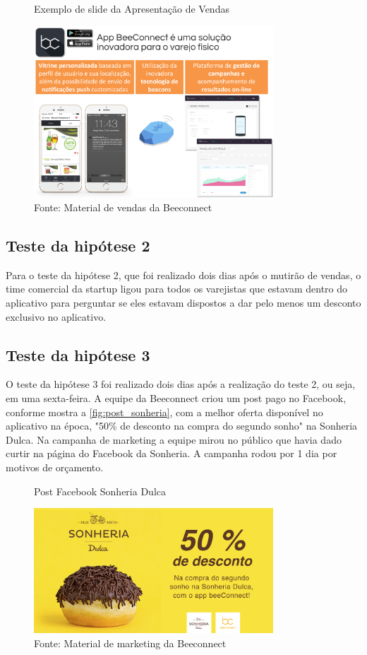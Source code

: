 \begin{figure}[H]
\caption{Exemplo de slide da Apresentação de Vendas}
\centerline{\includegraphics[width=0.8\textwidth]{img/apresentacao_vendas_bc}}
\label{fig:apresentacao_vendas_bc}
\caption* {Fonte: Material de vendas da Beeconnect}
\end{figure}

\subsection{Teste da hipótese 2}
\label{cha:teste_2}
Para o teste da hipótese 2, que foi realizado dois dias após o mutirão de vendas, o time comercial da startup ligou para todos os varejistas que estavam dentro do aplicativo para perguntar se eles estavam dispostos a dar pelo menos um desconto exclusivo no aplicativo.

\subsection{Teste da hipótese 3}
\label{cha:teste_3}
O teste da hipótese 3 foi realizado dois dias após a realização do teste 2, ou seja, em uma sexta-feira. A equipe da Beeconnect criou um post pago no Facebook, conforme mostra a \autoref{fig:post_sonheria}, com a melhor oferta disponível no aplicativo na época, "50\% de desconto na compra do segundo sonho" na Sonheria Dulca. Na campanha de marketing a equipe mirou no público que havia dado curtir na página do Facebook da Sonheria. A campanha rodou por 1 dia por motivos de orçamento.

\begin{figure}[H]
\caption{Post Facebook Sonheria Dulca}
\centerline{\includegraphics[width=0.8\textwidth]{img/post_sonheria}}
\label{fig:post_sonheria}
\caption* {Fonte: Material de marketing da Beeconnect}
\end{figure}

